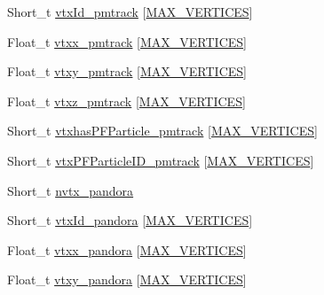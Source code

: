 \begin{DoxyCompactItemize}
Short\-\_\-t \hyperlink{classanatree_ac4dbad19aa6ecea4cd20fc7853e57dad}{vtx\-Id\-\_\-pmtrack} \mbox{[}\hyperlink{anatree__core__v09410002__orig_8h_a6ac49acb0970e608315ca232a9fc8828}{M\-A\-X\-\_\-\-V\-E\-R\-T\-I\-C\-E\-S}\mbox{]}
\item 
Float\-\_\-t \hyperlink{classanatree_abdcd02d6a678ed35fd1cd7813e37e073}{vtxx\-\_\-pmtrack} \mbox{[}\hyperlink{anatree__core__v09410002__orig_8h_a6ac49acb0970e608315ca232a9fc8828}{M\-A\-X\-\_\-\-V\-E\-R\-T\-I\-C\-E\-S}\mbox{]}
\item 
Float\-\_\-t \hyperlink{classanatree_ad78994567ecddbe0480f7bc23724981c}{vtxy\-\_\-pmtrack} \mbox{[}\hyperlink{anatree__core__v09410002__orig_8h_a6ac49acb0970e608315ca232a9fc8828}{M\-A\-X\-\_\-\-V\-E\-R\-T\-I\-C\-E\-S}\mbox{]}
\item 
Float\-\_\-t \hyperlink{classanatree_a7e5de17f424482581b756ef1d657d981}{vtxz\-\_\-pmtrack} \mbox{[}\hyperlink{anatree__core__v09410002__orig_8h_a6ac49acb0970e608315ca232a9fc8828}{M\-A\-X\-\_\-\-V\-E\-R\-T\-I\-C\-E\-S}\mbox{]}
\item 
Short\-\_\-t \hyperlink{classanatree_a401d11b726242649173a75d0d13a00ac}{vtxhas\-P\-F\-Particle\-\_\-pmtrack} \mbox{[}\hyperlink{anatree__core__v09410002__orig_8h_a6ac49acb0970e608315ca232a9fc8828}{M\-A\-X\-\_\-\-V\-E\-R\-T\-I\-C\-E\-S}\mbox{]}
\item 
Short\-\_\-t \hyperlink{classanatree_a9532423e7e4c050a587f1ec3eeaa2def}{vtx\-P\-F\-Particle\-I\-D\-\_\-pmtrack} \mbox{[}\hyperlink{anatree__core__v09410002__orig_8h_a6ac49acb0970e608315ca232a9fc8828}{M\-A\-X\-\_\-\-V\-E\-R\-T\-I\-C\-E\-S}\mbox{]}
\item 
Short\-\_\-t \hyperlink{classanatree_a7c05547f4a8b01e49426ef990664752a}{nvtx\-\_\-pandora}
\item 
Short\-\_\-t \hyperlink{classanatree_ac9363722862108c4539de33bc14990f2}{vtx\-Id\-\_\-pandora} \mbox{[}\hyperlink{anatree__core__v09410002__orig_8h_a6ac49acb0970e608315ca232a9fc8828}{M\-A\-X\-\_\-\-V\-E\-R\-T\-I\-C\-E\-S}\mbox{]}
\item 
Float\-\_\-t \hyperlink{classanatree_ae702221266aaf398574e6c0a4b956e41}{vtxx\-\_\-pandora} \mbox{[}\hyperlink{anatree__core__v09410002__orig_8h_a6ac49acb0970e608315ca232a9fc8828}{M\-A\-X\-\_\-\-V\-E\-R\-T\-I\-C\-E\-S}\mbox{]}
\item 
Float\-\_\-t \hyperlink{classanatree_a3ada5e38c3707cf6b65ded5d0aed1be5}{vtxy\-\_\-pandora} \mbox{[}\hyperlink{anatree__core__v09410002__orig_8h_a6ac49acb0970e608315ca232a9fc8828}{M\-A\-X\-\_\-\-V\-E\-R\-T\-I\-C\-E\-S}\mbox{]}
\item 

\end{DoxyCompactItemize}
